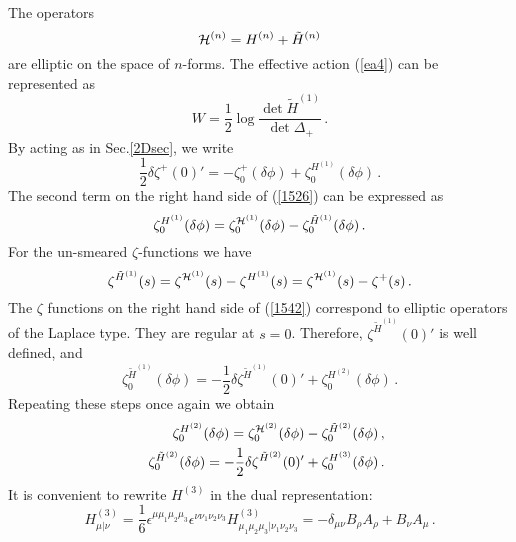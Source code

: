 \documentclass[a4paper,12pt]{article}
\begin{document}
The operators
\begin{equation}
{\cal H}^{(n)}=H^{(n)}+\tilde H^{(n)} \label{calH}
\end{equation}
are elliptic on the space of $n$-forms.
The effective action (\ref{ea4}) can be represented as
\begin{equation}
W=\frac 12 \log \frac {\det \tilde H^{(1)}}{\det \Delta_+} \,.
\label{eff4D}
\end{equation}
By acting as in Sec.\ref{2Dsec}, we write
\begin{equation}
\frac 12 \delta \zeta^+(0)'=-\zeta_0^+ (\delta\phi )
+\zeta_0^{H^{(1)}} (\delta\phi ) \,. \label{1526}
\end{equation}
The second term on the right hand side of (\ref{1526})
can be expressed as
\begin{equation}
\zeta_0^{H^{(1)}} (\delta\phi )=
\zeta_0^{{\cal H}^{(1)}} (\delta\phi )-
\zeta_0^{\tilde H^{(1)}} (\delta\phi ) \,. \label{1534}
\end{equation}
For the un-smeared $\zeta$-functions we have
\begin{equation}
\zeta^{\tilde H^{(1)}}(s)=\zeta^{{\cal H}^{(1)}} (s)
-\zeta^{H^{(1)}}(s)=
\zeta^{{\cal H}^{(1)}} (s)-\zeta^+ (s) \,.
\label{1542}
\end{equation}
The $\zeta$ functions on the right hand side of (\ref{1542})
correspond to elliptic operators of the Laplace type.
They are regular at $s=0$. Therefore, 
$\zeta^{\tilde H^{(1)}}(0)'$ is well defined, and
\begin{equation}
\zeta_0^{\tilde H^{(1)}} (\delta\phi )=
-\frac 12 \delta \zeta^{\tilde H^{(1)}}(0)' +
\zeta_0^{H^{(2)}} (\delta\phi ) \,.         \label{1554}
\end{equation}
Repeating these steps once again we obtain
\begin{eqnarray}
&&\zeta_0^{H^{(2)}} (\delta\phi )=
\zeta_0^{{\cal H}^{(2)}} (\delta\phi )-
\zeta_0^{\tilde H^{(2)}} (\delta\phi ) \,,     \nonumber \\
&&\zeta_0^{\tilde H^{(2)}} (\delta\phi )=
-\frac 12 \delta \zeta^{\tilde H^{(2)}}(0)' +
\zeta_0^{H^{(3)}} (\delta\phi )  \,.
\label{1556}
\end{eqnarray}
It is convenient to rewrite $H^{(3)}$ in the dual representation:
\begin{equation}
H^{(3)}_{\mu |\nu}=\frac 16 \epsilon^{\mu\mu_1\mu_2\mu_3}
\epsilon^{\nu\nu_1\nu_2\nu_3}
H^{(3)}_{\mu_1\mu_2\mu_3 |\nu_1\nu_2\nu_3}
=-\delta_{\mu\nu} B_\rho A_\rho +B_\nu A_\mu \,. \label{H3dual} 
\end{equation}
\end{document}
